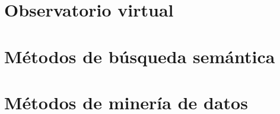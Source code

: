 \documentclass[openany]{book}
\begin{document}

\frontmatter
\pagestyle{fancy}


\renewcommand{\listfigurename}{Índice de imágenes}
\renewcommand{\listtablename}{Índice de tablas}
\renewcommand{\figurename}{Imagen}
\renewcommand{\tablename}{Tabla}
\tableofcontents
\listoftables
{}
\listoffigures
{}




\mainmatter
\part{Observatorio virtual}







\part{M\'etodos de búsqueda semántica}


\part{M\'etodos de minería de datos}


\backmatter


\end{document}
